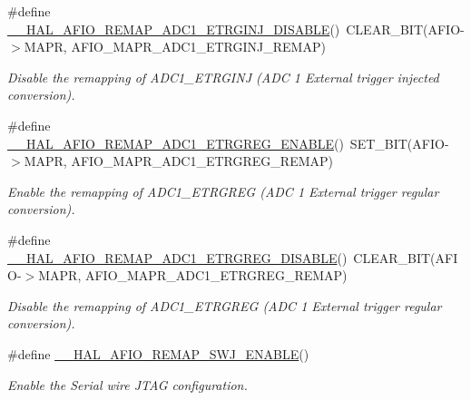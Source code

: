 \begin{DoxyCompactItemize}
\#define \hyperlink{group___g_p_i_o_ex___a_f_i_o___a_f___r_e_m_a_p_p_i_n_g_gabfe11a5ef987530e111e8e20a11e5be2}{\+\_\+\+\_\+\+H\+A\+L\+\_\+\+A\+F\+I\+O\+\_\+\+R\+E\+M\+A\+P\+\_\+\+A\+D\+C1\+\_\+\+E\+T\+R\+G\+I\+N\+J\+\_\+\+D\+I\+S\+A\+B\+LE}()~C\+L\+E\+A\+R\+\_\+\+B\+IT(A\+F\+IO-\/$>$M\+A\+PR, A\+F\+I\+O\+\_\+\+M\+A\+P\+R\+\_\+\+A\+D\+C1\+\_\+\+E\+T\+R\+G\+I\+N\+J\+\_\+\+R\+E\+M\+AP)
\begin{DoxyCompactList}\small\item\em Disable the remapping of A\+D\+C1\+\_\+\+E\+T\+R\+G\+I\+NJ (A\+DC 1 External trigger injected conversion). \end{DoxyCompactList}\item 
\#define \hyperlink{group___g_p_i_o_ex___a_f_i_o___a_f___r_e_m_a_p_p_i_n_g_gad8af529aefe269d0bd67b9c4095bfed8}{\+\_\+\+\_\+\+H\+A\+L\+\_\+\+A\+F\+I\+O\+\_\+\+R\+E\+M\+A\+P\+\_\+\+A\+D\+C1\+\_\+\+E\+T\+R\+G\+R\+E\+G\+\_\+\+E\+N\+A\+B\+LE}()~S\+E\+T\+\_\+\+B\+IT(A\+F\+IO-\/$>$M\+A\+PR, A\+F\+I\+O\+\_\+\+M\+A\+P\+R\+\_\+\+A\+D\+C1\+\_\+\+E\+T\+R\+G\+R\+E\+G\+\_\+\+R\+E\+M\+AP)
\begin{DoxyCompactList}\small\item\em Enable the remapping of A\+D\+C1\+\_\+\+E\+T\+R\+G\+R\+EG (A\+DC 1 External trigger regular conversion). \end{DoxyCompactList}\item 
\#define \hyperlink{group___g_p_i_o_ex___a_f_i_o___a_f___r_e_m_a_p_p_i_n_g_gac48e8a99b97904542ff0b1b9fb7ad8f5}{\+\_\+\+\_\+\+H\+A\+L\+\_\+\+A\+F\+I\+O\+\_\+\+R\+E\+M\+A\+P\+\_\+\+A\+D\+C1\+\_\+\+E\+T\+R\+G\+R\+E\+G\+\_\+\+D\+I\+S\+A\+B\+LE}()~C\+L\+E\+A\+R\+\_\+\+B\+IT(A\+F\+IO-\/$>$M\+A\+PR, A\+F\+I\+O\+\_\+\+M\+A\+P\+R\+\_\+\+A\+D\+C1\+\_\+\+E\+T\+R\+G\+R\+E\+G\+\_\+\+R\+E\+M\+AP)
\begin{DoxyCompactList}\small\item\em Disable the remapping of A\+D\+C1\+\_\+\+E\+T\+R\+G\+R\+EG (A\+DC 1 External trigger regular conversion). \end{DoxyCompactList}\item 
\#define \hyperlink{group___g_p_i_o_ex___a_f_i_o___a_f___r_e_m_a_p_p_i_n_g_ga9e3b30234057b920408944eecfbd1e40}{\+\_\+\+\_\+\+H\+A\+L\+\_\+\+A\+F\+I\+O\+\_\+\+R\+E\+M\+A\+P\+\_\+\+S\+W\+J\+\_\+\+E\+N\+A\+B\+LE}()
\begin{DoxyCompactList}\small\item\em Enable the Serial wire J\+T\+AG configuration. \end{DoxyCompactList}\item 

\end{DoxyCompactItemize}
